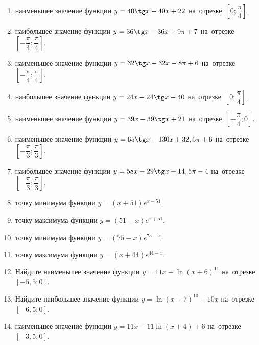 \documentclass[a4paper,10pt]{article}
\begin{document}
\begin{enumerate}
\item {} наименьшее значение функции $y = 40\tg x-40x+22$ на~отрезке~$\left[0;\dfrac{\pi }{4}\right]$.

\item {} наибольшее значение функции $y=36\tg x-36x+9\pi +7$ на~отрезке~$\left[-\dfrac{\pi }{4};\dfrac{\pi }{4}\right]$.

\item {} наименьшее значение функции $y=32\tg x-32x-8\pi +6$ на~отрезке~$\left[-\dfrac{\pi }{4};\dfrac{\pi }{4}\right]$.

\item {} наибольшее значение функции $y = 24x-24\tg x -40$ на~отрезке~$\left[0;\dfrac{\pi }{4}\right]$.

\item {} наименьшее значение функции $y = 39x-39\tg x +21$ на~отрезке~$\left[-\dfrac{\pi }{4};0\right]$.

\item {} наименьшее значение функции $y = 65\tg x-130x+32,5 \pi +6$ на~отрезке~$\left[-\dfrac{\pi }{3};\dfrac{\pi }{3}\right]$.

\item {} наибольшее значение функции $y = 58x-29\tg x-14,5\pi -4$ на~отрезке~$\left[-\dfrac{\pi }{3};\dfrac{\pi }{3}\right]$.

\item {} точку минимума функции $y = \left(x+51\right)e^{x-51}$.

\item {} точку максимума функции $y = \left(51-x\right)e^{x+51}$.

\item {} точку минимума функции $y = \left(75-x\right)e^{75-x}$.

\item {} точку максимума функции $y = \left(x+44\right)e^{44-x}$.

\item Найдите наименьшее значение функции $y = 11x-\ln \left(x+6\right)^{11}$ на~отрезке~$\left[-5,5;0\right]$.

\item Найдите наибольшее значение функции $y = \ln \left(x+7\right)^{10}-10x$ на~отрезке~$\left[-6,5;0\right]$.

\item {} наименьшее значение функции $y = 11x-11\ln \left(x+4\right) +6$ на~отрезке~$\left[-3,5;0\right]$.


\end{enumerate}
\end{document}
